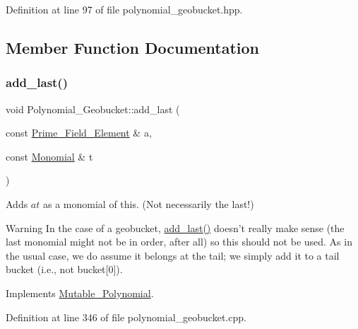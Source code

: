 Definition at line 97 of file polynomial\+\_\+geobucket.\+hpp.



\subsection{Member Function Documentation}
\mbox{\label{class_polynomial___geobucket_ac0be908fc725d5b246478b68297fe537}} 
\subsubsection{\texorpdfstring{add\+\_\+last()}{add\_last()}}
{\footnotesize\ttfamily void Polynomial\+\_\+\+Geobucket\+::add\+\_\+last (\begin{DoxyParamCaption}\item[{const \hyperlink{class_prime___field___element}{Prime\+\_\+\+Field\+\_\+\+Element} \&}]{a,  }\item[{const \hyperlink{class_monomial}{Monomial} \&}]{t }\end{DoxyParamCaption})\hspace{0.3cm}{\ttfamily [virtual]}}



Adds $at$ as a monomial of {\ttfamily this}. (Not necessarily the last!) 

\begin{DoxyWarning}{Warning}
In the case of a geobucket, \hyperlink{class_polynomial___geobucket_ac0be908fc725d5b246478b68297fe537}{add\+\_\+last()} doesn't really make sense (the last monomial might not be in order, after all) so this should not be used. As in the usual case, we do assume it belongs at the tail; we simply add it to a tail bucket (i.\+e., not {\ttfamily bucket\mbox{[}0\mbox{]}}). 
\end{DoxyWarning}


Implements \hyperlink{class_mutable___polynomial_a966bd6c897acf04ac697bc0a4ca46a89}{Mutable\+\_\+\+Polynomial}.



Definition at line 346 of file polynomial\+\_\+geobucket.\+cpp.

\mbox{\label{class_polynomial___geobucket_aa76d2c0dce16690b01e8a8c4862b11c5}} 
